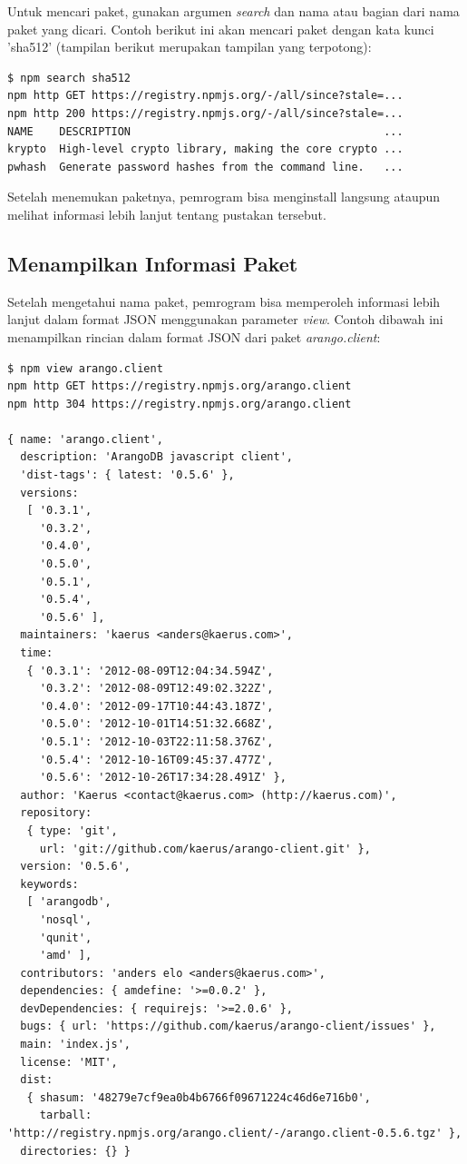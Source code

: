 Untuk mencari paket, gunakan argumen \textit{search} dan nama atau bagian dari nama paket yang dicari. Contoh berikut ini akan mencari paket dengan kata kunci 'sha512' (tampilan berikut merupakan tampilan yang terpotong):

\lstset{language=bash,caption=Perintah menghapus paket di npm}
\begin{lstlisting}
$ npm search sha512
npm http GET https://registry.npmjs.org/-/all/since?stale=...
npm http 200 https://registry.npmjs.org/-/all/since?stale=...
NAME    DESCRIPTION                                       ...
krypto  High-level crypto library, making the core crypto ...
pwhash  Generate password hashes from the command line.   ...
\end{lstlisting}

Setelah menemukan paketnya, pemrogram bisa menginstall langsung ataupun melihat informasi lebih lanjut tentang pustakan tersebut.

\subsection{Menampilkan Informasi Paket}

Setelah mengetahui nama paket, pemrogram bisa memperoleh informasi lebih lanjut dalam format JSON menggunakan parameter \textit{view}. Contoh dibawah ini menampilkan rincian dalam format JSON dari paket \textit{arango.client}:

\lstset{language=bash,caption=Menampilkan rincian suatu paket dalam format JSON}
\begin{lstlisting}
$ npm view arango.client
npm http GET https://registry.npmjs.org/arango.client
npm http 304 https://registry.npmjs.org/arango.client

{ name: 'arango.client',
  description: 'ArangoDB javascript client',
  'dist-tags': { latest: '0.5.6' },
  versions: 
   [ '0.3.1',
     '0.3.2',
     '0.4.0',
     '0.5.0',
     '0.5.1',
     '0.5.4',
     '0.5.6' ],
  maintainers: 'kaerus <anders@kaerus.com>',
  time: 
   { '0.3.1': '2012-08-09T12:04:34.594Z',
     '0.3.2': '2012-08-09T12:49:02.322Z',
     '0.4.0': '2012-09-17T10:44:43.187Z',
     '0.5.0': '2012-10-01T14:51:32.668Z',
     '0.5.1': '2012-10-03T22:11:58.376Z',
     '0.5.4': '2012-10-16T09:45:37.477Z',
     '0.5.6': '2012-10-26T17:34:28.491Z' },
  author: 'Kaerus <contact@kaerus.com> (http://kaerus.com)',
  repository: 
   { type: 'git',
     url: 'git://github.com/kaerus/arango-client.git' },
  version: '0.5.6',
  keywords: 
   [ 'arangodb',
     'nosql',
     'qunit',
     'amd' ],
  contributors: 'anders elo <anders@kaerus.com>',
  dependencies: { amdefine: '>=0.0.2' },
  devDependencies: { requirejs: '>=2.0.6' },
  bugs: { url: 'https://github.com/kaerus/arango-client/issues' },
  main: 'index.js',
  license: 'MIT',
  dist: 
   { shasum: '48279e7cf9ea0b4b6766f09671224c46d6e716b0',
     tarball: 'http://registry.npmjs.org/arango.client/-/arango.client-0.5.6.tgz' },
  directories: {} }
\end{lstlisting}

